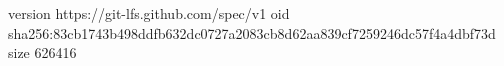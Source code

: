 version https://git-lfs.github.com/spec/v1
oid sha256:83cb1743b498ddfb632dc0727a2083cb8d62aa839cf7259246dc57f4a4dbf73d
size 626416
